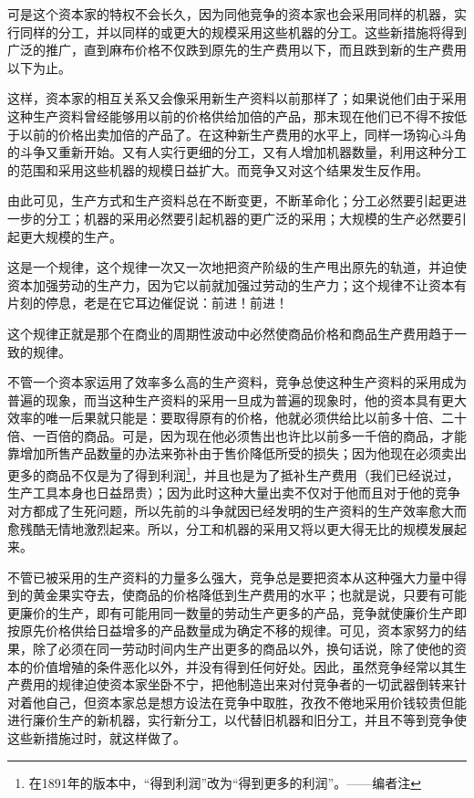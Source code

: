 \documentclass[a4paper,twoside,12pt,AutoFakeBold]{ctexart}
\begin{document}
可是这个资本家的特权不会长久，因为同他竞争的资本家也会采用同样的机器，实行同样的分工，并以同样的或更大的规模采用这些机器的分工。这些新措施将得到广泛的推广，直到麻布价格不仅跌到原先的生产费用以下，而且跌到新的生产费用以下为止。

这样，资本家的相互关系又会像采用新生产资料以前那样了；如果说他们由于采用这种生产资料曾经能够用以前的价格供给加倍的产品，那末现在他们已不得不按低于以前的价格出卖加倍的产品了。在这种新生产费用的水平上，同样一场钩心斗角的斗争又重新开始。又有人实行更细的分工，又有人增加机器数量，利用这种分工的范围和采用这些机器的规模日益扩大。而竞争又对这个结果发生反作用。

由此可见，生产方式和生产资料总在不断变更，不断革命化；分工必然要引起更进一步的分工；机器的采用必然要引起机器的更广泛的采用；大规模的生产必然要引起更大规模的生产。

这是一个规律，这个规律一次又一次地把资产阶级的生产甩出原先的轨道，并迫使资本加强劳动的生产力，因为它以前就加强过劳动的生产力；这个规律不让资本有片刻的停息，老是在它耳边催促说：前进！前进！

这个规律正就是那个在商业的周期性波动中必然使商品价格和商品生产费用趋于一致的规律。

不管一个资本家运用了效率多么高的生产资料，竞争总使这种生产资料的采用成为普遍的现象，而当这种生产资料的采用一旦成为普遍的现象时，他的资本具有更大效率的唯一后果就只能是：要取得原有的价格，他就必须供给比以前多十倍、二十倍、一百倍的商品。可是，因为现在他必须售出也许比以前多一千倍的商品，才能靠增加所售产品数量的办法来弥补由于售价降低所受的损失；因为他现在必须卖出更多的商品不仅是为了得到利润\footnote{在1891年的版本中，“得到利润”改为“得到更多的利润”。——编者注}，并且也是为了抵补生产费用（我们已经说过，生产工具本身也日益昂贵）；因为此时这种大量出卖不仅对于他而且对于他的竞争对方都成了生死问题，所以先前的斗争就因已经发明的生产资料的生产效率愈大而愈残酷无情地激烈起来。所以，分工和机器的采用又将以更大得无比的规模发展起来。

不管已被采用的生产资料的力量多么强大，竞争总是要把资本从这种强大力量中得到的黄金果实夺去，使商品的价格降低到生产费用的水平；也就是说，只要有可能更廉价的生产，即有可能用同一数量的劳动生产更多的产品，竞争就使廉价生产即按原先价格供给日益增多的产品数量成为确定不移的规律。可见，资本家努力的结果，除了必须在同一劳动时间内生产出更多的商品以外，换句话说，除了使他的资本的价值增殖的条件恶化以外，并没有得到任何好处。因此，虽然竞争经常以其生产费用的规律迫使资本家坐卧不宁，把他制造出来对付竞争者的一切武器倒转来针对着他自己，但资本家总是想方设法在竞争中取胜，孜孜不倦地采用价钱较贵但能进行廉价生产的新机器，实行新分工，以代替旧机器和旧分工，并且不等到竞争使这些新措施过时，就这样做了。
\end{document}
